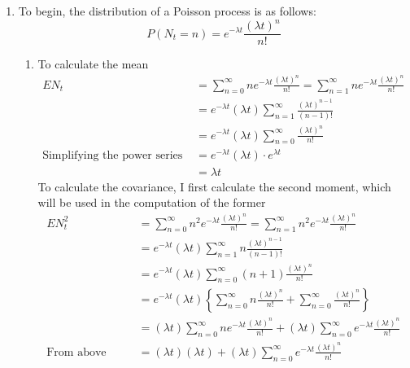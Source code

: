 \documentclass[12pt]{article}
\theoremstyle{plain}
\theoremstyle{definition}
\theoremstyle{remark}
\begin{document}
\begin{enumerate}
  \item %
    To begin, the distribution of a Poisson process is as follows:
    \begin{equation}
      P(N_t = n) = e^{-\lambda t} \frac{(\lambda t)^n}{n!}
    \end{equation}
    \begin{enumerate}
      \item %
        To calculate the mean
        \begin{align*}
          EN_t &=
            \sum^\infty_{n=0} n e^{-\lambda t} \frac{(\lambda t)^n}{n!}
            =\sum^\infty_{n=1} n e^{-\lambda t} \frac{(\lambda t)^n}{n!}\\
          &=e^{-\lambda t} (\lambda t) \sum^\infty_{n=1}
          \frac{(\lambda t)^{n-1}}{(n-1)!}\\
          &=e^{-\lambda t} (\lambda t) \sum^\infty_{n=0}
            \frac{(\lambda t)^{n}}{n!}\\
          \text{Simplifying the power series} \qquad
          &=e^{-\lambda t} (\lambda t) \cdot e^{\lambda t}\\
          &=\lambda t
        \end{align*}
        To calculate the covariance, I first calculate the second
        moment, which will be used in the computation of the former
        \begin{align*}
          EN_t^2 &=
            \sum^\infty_{n=0} n^2 e^{-\lambda t} \frac{(\lambda t)^n}{n!}
            =\sum^\infty_{n=1} n^2 e^{-\lambda t} \frac{(\lambda t)^n}{n!}\\
          &=e^{-\lambda t} (\lambda t) \sum^\infty_{n=1} n
          \frac{(\lambda t)^{n-1}}{(n-1)!}\\
          &=e^{-\lambda t} (\lambda t) \sum^\infty_{n=0} (n+1)
            \frac{(\lambda t)^{n}}{n!}\\
          &=e^{-\lambda t} (\lambda t) \left\{\sum^\infty_{n=0} n
            \frac{(\lambda t)^{n}}{n!} + \sum^\infty_{n=0}
            \frac{(\lambda t)^{n}}{n!}\right\}\\
          &=(\lambda t) \sum^\infty_{n=0} ne^{-\lambda t}
            \frac{(\lambda t)^{n}}{n!}
            +  (\lambda t)\sum^\infty_{n=0}e^{-\lambda t}
            \frac{(\lambda t)^{n}}{n!}\\
          \text{From above} \qquad
          &=(\lambda t)(\lambda t)
            +  (\lambda t)\sum^\infty_{n=0}e^{-\lambda t}
            \frac{(\lambda t)^{n}}{n!}\\

\end{align*}
\end{enumerate}
\end{enumerate}
\end{document}
